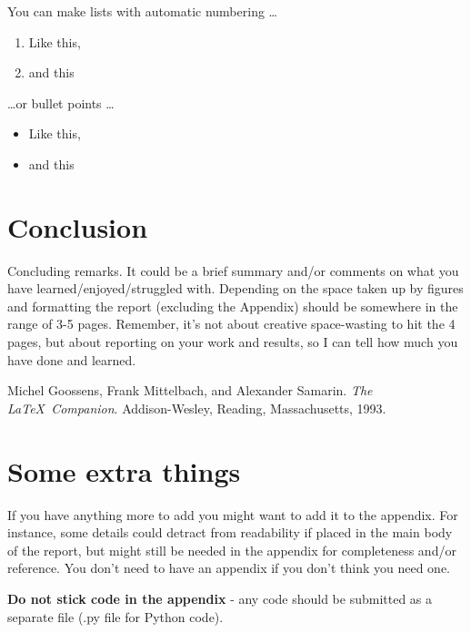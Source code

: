 \documentclass[12pt]{article}
\begin{document}
You can make lists with automatic numbering \dots

\begin{enumerate}
\item Like this,
\item and this
\end{enumerate}
\dots or bullet points \dots
\begin{itemize}
\item Like this,
\item and this
\end{itemize}

\section{Conclusion}

Concluding remarks.  It could be a brief summary and/or comments on what you have learned/enjoyed/struggled with.      Depending on the space taken up by figures and formatting the report (excluding the Appendix) should be somewhere in the range of 3-5 pages.  Remember, it's not about creative space-wasting to hit the 4 pages, but about reporting on your work and results, so I can tell how much you have done and learned.  





\begin{thebibliography}{3}

Michel Goossens, Frank Mittelbach, and Alexander Samarin. \textit{The \LaTeX\ Companion}. Addison-Wesley, Reading, Massachusetts, 1993.

\end{thebibliography}


\appendix

\renewcommand{\thesection}{Appendix \Alph{section}}

\section{Some extra things}

If you have anything more to add you might want to add it to the appendix.  For instance, some details could detract from readability if placed in the main body of the report, but might still be needed in the appendix for completeness and/or reference.  You don't need to have an appendix if you don't think you need one.

\textbf{Do not stick code in the appendix} - any code should be submitted as a separate file (.py file for Python code).  
\end{document}
